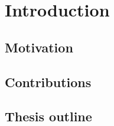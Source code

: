 
\chapter{Introduction} %
\label{cha:introduction}

\minitoc

\section{Motivation} %
\label{sec:motivation}

\lipsum



\section{Contributions} %
\label{sec:contributions}

\lipsum


\section{Thesis outline} %
\label{sec:thesis_outline}

\lipsum

